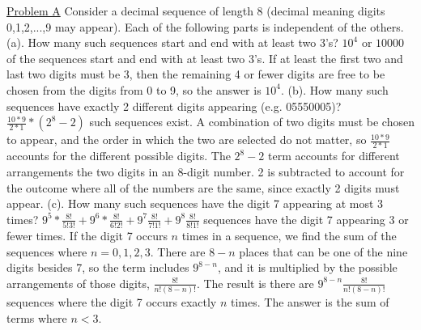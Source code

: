 \documentclass{article}
\begin{document}
\underline{Problem A}
Consider a decimal sequence of length 8 (decimal meaning digits 0,1,2,...,9 may appear). Each of
the following parts is independent of the others.\newline{}
(a). How many such sequences start and end with at least two 3’s?\newline{}
$10^4$ or $10000$ of the sequences start and end with at least two 3's. If at least the first two and last two digits must be 3, then the remaining 4 or fewer digits are free to be chosen from the digits from 0 to 9, so the answer is $10^4$.\newline{}\newline{}
(b). How many such sequences have exactly 2 different digits appearing (e.g. 05550005)?\newline{}
$\frac{10*9}{2*1}*(2^8-2)$ such sequences exist. A combination of two digits must be chosen to appear, and the order in which the two are selected do not matter, so $\frac{10*9}{2*1}$ accounts for the different possible digits. The $2^8-2$ term accounts for different arrangements the two digits in an 8-digit number. 2 is subtracted to account for the outcome where all of the numbers are the same, since exactly 2 digits must appear.\newline{}\newline{}
(c). How many such sequences have the digit 7 appearing at most 3 times?\newline{}
$9^5*\frac{8!}{5!3!}+9^6*\frac{8!}{6!2!}+9^7\frac{8!}{7!1!}+9^8\frac{8!}{8!1!}$ sequences have the digit 7 appearing 3 or fewer times. If the digit 7 occurs $n$ times in a sequence, we find the sum of the sequences where $n=0,1,2,3$. There are $8-n$ places that can be one of the nine digits besides 7, so the term includes $9^{8-n}$, and it is multiplied by the possible arrangements of those digits, $\frac{8!}{n!(8-n)!}$. The result is there are $9^{8-n}\frac{8!}{n!(8-n)!}$ sequences where the digit 7 occurs exactly $n$ times. The answer is the sum of terms where $n<3$.
\end{document}
